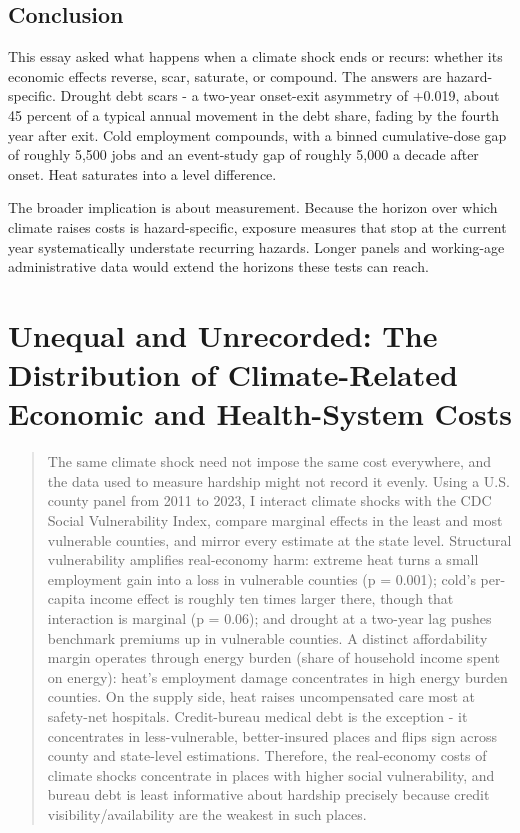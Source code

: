 \documentclass[a4paper,11pt]{report}
\begin{document}
\FloatBarrier
\section{Conclusion}

This essay asked what happens when a climate shock ends or recurs: whether its economic effects reverse, scar, saturate, or compound. The answers are hazard-specific. Drought debt scars - a two-year onset-exit asymmetry of +0.019, about 45 percent of a typical annual movement in the debt share, fading by the fourth year after exit. Cold employment compounds, with a binned cumulative-dose gap of roughly 5,500 jobs and an event-study gap of roughly 5,000 a decade after onset. Heat saturates into a level difference.

The broader implication is about measurement. Because the horizon over which climate raises costs is hazard-specific, exposure measures that stop at the current year systematically understate recurring hazards. Longer panels and working-age administrative data would extend the horizons these tests can reach.

\FloatBarrier
\chapter{Unequal and Unrecorded: The Distribution of Climate-Related Economic and Health-System Costs}

\begingroup\small\begin{quote}
The same climate shock need not impose the same cost everywhere, and the data used to measure hardship might not record it evenly. Using a U.S. county panel from 2011 to 2023, I interact climate shocks with the CDC Social Vulnerability Index, compare marginal effects in the least and most vulnerable counties, and mirror every estimate at the state level. Structural vulnerability amplifies real-economy harm: extreme heat turns a small employment gain into a loss in vulnerable counties (p = 0.001); cold's per-capita income effect is roughly ten times larger there, though that interaction is marginal (p = 0.06); and drought at a two-year lag pushes benchmark premiums up in vulnerable counties. A distinct affordability margin operates through energy burden (share of household income spent on energy): heat's employment damage concentrates in high energy burden counties. On the supply side, heat raises uncompensated care most at safety-net hospitals. Credit-bureau medical debt is the exception - it concentrates in less-vulnerable, better-insured places and flips sign across county and state-level estimations. Therefore, the real-economy costs of climate shocks concentrate in places with higher social vulnerability, and bureau debt is least informative about hardship precisely because credit visibility/availability are the weakest in such places.
\end{quote}\endgroup
\end{document}
